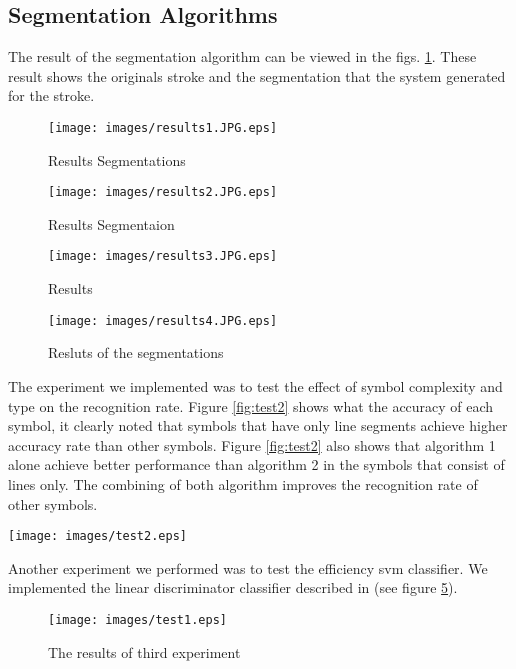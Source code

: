 \subsection{Segmentation Algorithms}
\label{sec:SegmentationAlgorithms}
The result of the segmentation algorithm can be viewed in the figs. \ref{fig:results1.JPG}. These result shows the originals stroke and the segmentation that the system generated for the stroke. 
\begin{figure}
	\centering
		\texttt{[image: images/results1.JPG.eps]}
	\caption{Results Segmentations}
	\label{fig:results1.JPG}
\end{figure}
\begin{figure}
	\centering
		\texttt{[image: images/results2.JPG.eps]}
	\caption{Results Segmentaion }
	\label{fig:results2.JPG}
\end{figure}
\begin{figure}
	\centering
		\texttt{[image: images/results3.JPG.eps]}
	\caption{Results }
	\label{fig:results3.JPG}
\end{figure}
\begin{figure}
	\centering
		\texttt{[image: images/results4.JPG.eps]}
	\caption{Resluts of the segmentations}
	\label{fig:results4.JPG}
\end{figure}



The experiment we implemented was to test the effect of symbol complexity and type on the recognition rate. Figure \ref{fig:test2} shows what the accuracy of each symbol, it clearly noted that symbols that have only line segments achieve higher accuracy rate than other symbols. Figure \ref{fig:test2} also shows that algorithm 1 alone achieve better performance than algorithm 2 in the symbols that consist of lines only. The combining of both algorithm improves the recognition rate of other symbols.  \\
\begin{figure*}[]
	\centering
		\texttt{[image: images/test2.eps]}
	\caption{The results of second experiment}
	\label{fig:test2}
\end{figure*}
 Another experiment we performed was to test the efficiency svm classifier. We implemented the linear discriminator classifier described in \cite{gestureexample12}(see figure \ref{fig:test3}).  %
\begin{figure}[]
	\centering
		\texttt{[image: images/test1.eps]}
	\caption{The results of third experiment}
	\label{fig:test3}
\end{figure}
 
